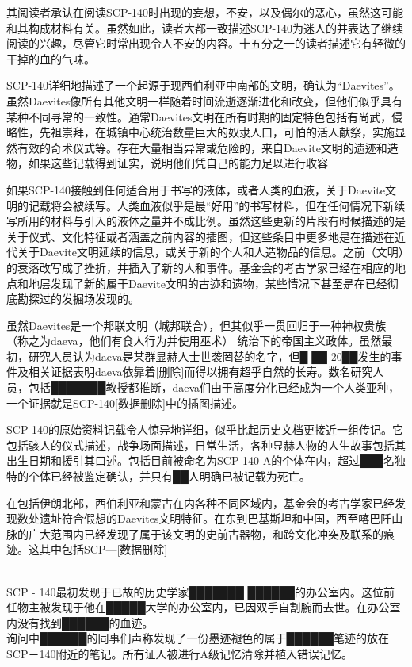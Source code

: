 其阅读者承认在阅读SCP-140时出现的妄想，不安，以及偶尔的恶心，虽然这可能和其构成材料有关。虽然如此，读者大都一致描述SCP-140为迷人的并表达了继续阅读的兴趣，尽管它时常出现令人不安的内容。十五分之一的读者描述它有轻微的干掉的血的气味。

SCP-140详细地描述了一个起源于现西伯利亚中南部的文明，确认为“Daevites”。虽然Daevites像所有其他文明一样随着时间流逝逐渐进化和改变，但他们似乎具有某种不同寻常的一致性。通常Daevites文明在所有时期的固定特色包括有尚武，侵略性，先祖崇拜，在城镇中心统治数量巨大的奴隶人口，可怕的活人献祭，实施显然有效的奇术仪式等。存在大量相当异常或危险的，来自Daevite文明的遗迹和造物，如果这些记载得到证实，说明他们凭自己的能力足以进行收容

如果SCP-140接触到任何适合用于书写的液体，或者人类的血液，关于Daevite文明的记载将会被续写。人类血液似乎是最“好用”的书写材料，但在任何情况下新续写所用的材料与引入的液体之量并不成比例。虽然这些更新的片段有时候描述的是关于仪式、文化特征或者涵盖之前内容的插图，但这些条目中更多地是在描述在近代关于Daevite文明延续的信息，或关于新的个人和人造物品的信息。之前（文明）的衰落改写成了挫折，并插入了新的人和事件。基金会的考古学家已经在相应的地点和地层发现了新的属于Daevite文明的古迹和遗物，某些情况下甚至是在已经彻底勘探过的发掘场发现的。

虽然Daevites是一个邦联文明（城邦联合），但其似乎一贯回归于一种神权贵族（称之为daeva，他们有食人行为并使用巫术） 统治下的帝国主义政体。虽然最初，研究人员认为daeva是某群显赫人士世袭罔替的名字，但█-██-20██发生的事件及相关证据表明daeva依靠着{[}删除]而得以拥有超乎自然的长寿。数名研究人员，包括███████教授都推断，daeva们由于高度分化已经成为一个人类亚种，一个证据就是SCP-140{[}数据删除]中的插图描述。

SCP-140的原始资料记载令人惊异地详细，似乎比起历史文档更接近一组传记。它包括骇人的仪式描述，战争场面描述，日常生活，各种显赫人物的人生故事包括其出生日期和援引其口述。包括目前被命名为SCP-140-A的个体在内，超过███名独特的个体已经被鉴定确认，并只有██人明确已被记载为死亡。

在包括伊朗北部，西伯利亚和蒙古在内各种不同区域内，基金会的考古学家已经发现数处遗址符合假想的Daevites文明特征。在东到巴基斯坦和中国，西至喀巴阡山脉的广大范围内已经发现了属于该文明的史前古器物，和跨文化冲突及联系的痕迹。这其中包括SCP—{[}数据删除]

\\
SCP - 140最初发现于已故的历史学家███████ ██████的办公室内。这位前任物主被发现于他在█████大学的办公室内，已因双手自割腕而去世。在办公室内没有找到██████的血迹。\\
询问中██████的同事们声称发现了一份墨迹褪色的属于██████笔迹的放在SCP－140附近的笔记。所有证人被进行A级记忆清除并植入错误记忆。

